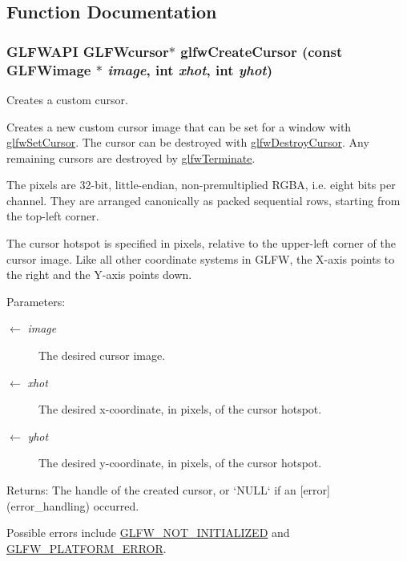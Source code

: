 \subsection{Function Documentation}
\hypertarget{group__input_gc0f0f691f2d110f9acfb4bfe07f1216c}{
\subsubsection[glfwCreateCursor]{\setlength{\rightskip}{0pt plus 5cm}GLFWAPI {\bf GLFWcursor}$\ast$ glfwCreateCursor (const {\bf GLFWimage} $\ast$ {\em image}, \/  int {\em xhot}, \/  int {\em yhot})}}
\label{group__input_gc0f0f691f2d110f9acfb4bfe07f1216c}


Creates a custom cursor. 

Creates a new custom cursor image that can be set for a window with \hyperlink{group__input_gfaf103cea2f43530cff7de4e01126a4f}{glfwSetCursor}. The cursor can be destroyed with \hyperlink{group__input_g27556b7122117bc1bbb4bb3cc003ea43}{glfwDestroyCursor}. Any remaining cursors are destroyed by \hyperlink{group__init_gfd90e6fd4819ea9e22e5e739519a6504}{glfwTerminate}.

The pixels are 32-bit, little-endian, non-premultiplied RGBA, i.e. eight bits per channel. They are arranged canonically as packed sequential rows, starting from the top-left corner.

The cursor hotspot is specified in pixels, relative to the upper-left corner of the cursor image. Like all other coordinate systems in GLFW, the X-axis points to the right and the Y-axis points down.

\begin{Desc}
\item[Parameters:]
\begin{description}
\item[\mbox{$\leftarrow$} {\em image}]The desired cursor image. \item[\mbox{$\leftarrow$} {\em xhot}]The desired x-coordinate, in pixels, of the cursor hotspot. \item[\mbox{$\leftarrow$} {\em yhot}]The desired y-coordinate, in pixels, of the cursor hotspot. \end{description}
\end{Desc}
\begin{Desc}
\item[Returns:]The handle of the created cursor, or `NULL` if an \mbox{[}error\mbox{]}(error\_\-handling) occurred.\end{Desc}
Possible errors include \hyperlink{group__errors_g2374ee02c177f12e1fa76ff3ed15e14a}{GLFW\_\-NOT\_\-INITIALIZED} and \hyperlink{group__errors_gd44162d78100ea5e87cdd38426b8c7a1}{GLFW\_\-PLATFORM\_\-ERROR}.

